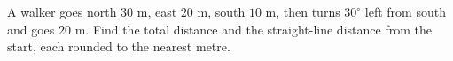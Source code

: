 A walker goes north $30$ m, east $20$ m, south $10$ m, then turns $30^\circ$ left from south and goes $20$ m. Find the total distance and the straight-line distance from the start, each rounded to the nearest metre.
